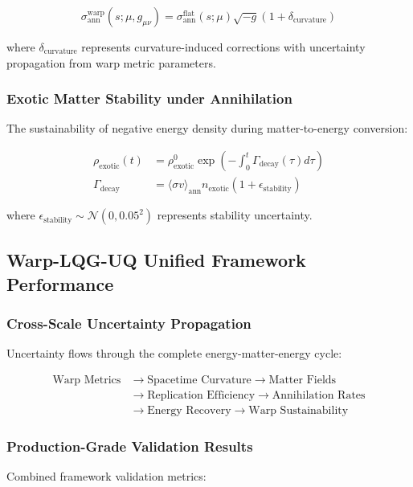 \documentclass[11pt]{article}
\begin{document}
\begin{equation}
\sigma_{\text{ann}}^{\text{warp}}(s; \mu, g_{\mu\nu}) = \sigma_{\text{ann}}^{\text{flat}}(s; \mu) \sqrt{-g} \left(1 + \delta_{\text{curvature}}\right)
\end{equation}

where $\delta_{\text{curvature}}$ represents curvature-induced corrections with uncertainty propagation from warp metric parameters.

\subsubsection{Exotic Matter Stability under Annihilation}
The sustainability of negative energy density during matter-to-energy conversion:

\begin{align}
\rho_{\text{exotic}}(t) &= \rho_{\text{exotic}}^0 \exp\left(-\int_0^t \Gamma_{\text{decay}}(\tau) d\tau\right) \\
\Gamma_{\text{decay}} &= \langle\sigma v\rangle_{\text{ann}} n_{\text{exotic}}(1 + \epsilon_{\text{stability}})
\end{align}

where $\epsilon_{\text{stability}} \sim \mathcal{N}(0, 0.05^2)$ represents stability uncertainty.

\subsection{Warp-LQG-UQ Unified Framework Performance}

\subsubsection{Cross-Scale Uncertainty Propagation}
Uncertainty flows through the complete energy-matter-energy cycle:

\begin{align}
\text{Warp Metrics} &\rightarrow \text{Spacetime Curvature} \rightarrow \text{Matter Fields} \\
&\rightarrow \text{Replication Efficiency} \rightarrow \text{Annihilation Rates} \\
&\rightarrow \text{Energy Recovery} \rightarrow \text{Warp Sustainability}
\end{align}

\subsubsection{Production-Grade Validation Results}
Combined framework validation metrics:
\end{document}
